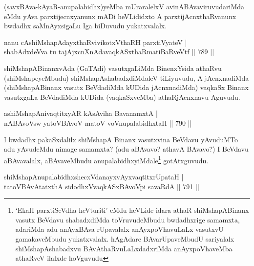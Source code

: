 \begin{artha}
(savxBAva-kAyaR-anupalabidhx)yeMba mUraralelxV avinABAvaviruvudariMda eMdu yAva parxtijecnxyanunx mADi heVLididxto A parxtijAcnxthaRvanunx bwdadhx saMnAyxsigaLu Iga biDuvudu yukatxvalalx.
\end{artha}


\begin{shl}
nanu cAshiMshapAdayxthaRvivikotxV\s thaRH parxtiVyateV | \\
shabAdxdeVva tu tajAjxcnXnAdavaqkASxthaRmatiBaRveVtf \hfill||  789 ||  
\end{shl}

\begin{artha}
shiMshapABinanxvAda (GaTAdi) vasutxgaLiMda BinenxYsida athaRvu (shiMshapeyeMbudu) shiMshapAshabadxdiMdaleV tiLiyuvudu, A jAcnxnadiMda (shiMshapABinanx vasutx BeVdadiMda kUDida jAcnxnadiMda) vaqkaSx Binanx vasutxgaLa BeVdadiMda kUDida (vaqkaSxveMba) athaRjAcnxnavu Aguvudu.
\end{artha}


\begin{shl}
ashiMshapAnivaqtitxyAR kA\s sAviha BavanamxtA | \\
nABAvoV\s sw yatoV\s BAvoV matoV voV\s nupalabidhxtaH \hfill||  790 ||  
\end{shl}

\begin{artha}
I bwdadhx pakaSxdalilx shiMshapA Binanx vasutxvina BeVdavu yAvuduMTo adu yAvudeMdu nimage samamxta? (adu aBAvavo? athavA BAvavo?) I BeVdavu aBAvavalalx, aBAvaveMbudu anupalabidhxyiMdale\footnote{`EkaH parxtiSeVdha heVturiti' eMdu heVLide idara athaR shiMshapABinanx vasutx BeVdavu shabadxdiMda toVruvudeMbudu bwdadhxrige samamxta, adariMda adu anAyxBAva rUpavalalx anAyxpoVhavuLaLx vasutxvU gamakaveMbudu yukatxvalalx. hAgAdare BAvarUpaveMbudU sariyalalx shiMshapAshabadxvu BAvAthaRvuLaLxdadxriMda anAyxpoVhaveMba athaRveV ilalxde hoVguvudu} gotAtxguvudu.
\end{artha}


\begin{shl}
shiMshapAnupalabidhxshecxVdanayxvAyxvaqtitxrUpataH | \\
tatoV\s BAvAtatxthA sidodhxV\s vaqkASxBAvoV\s pi savaRdA \hfill||  791 ||  
\end{shl}


